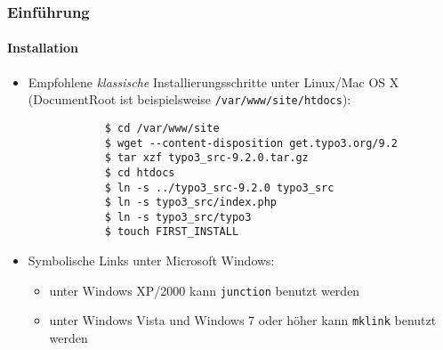 \begin{frame}[fragile]
	\frametitle{Einführung}
	\framesubtitle{Installation}

	\begin{itemize}
		\item Empfohlene \textit{klassische} Installierungsschritte unter Linux/Mac OS X\newline
			(DocumentRoot ist beispielsweise \texttt{/var/www/site/htdocs}):
		\begin{lstlisting}
			$ cd /var/www/site
			$ wget --content-disposition get.typo3.org/9.2
			$ tar xzf typo3_src-9.2.0.tar.gz
			$ cd htdocs
			$ ln -s ../typo3_src-9.2.0 typo3_src
			$ ln -s typo3_src/index.php
			$ ln -s typo3_src/typo3
			$ touch FIRST_INSTALL
		\end{lstlisting}

		\item Symbolische Links unter Microsoft Windows:

			\begin{itemize}
				\item unter Windows XP/2000 kann \texttt{junction} benutzt werden
				\item unter Windows Vista und Windows 7 oder höher kann \texttt{mklink} benutzt werden
			\end{itemize}

	\end{itemize}
\end{frame}

